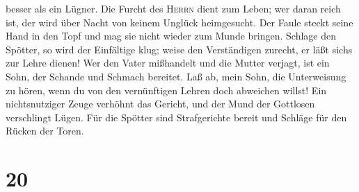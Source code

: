 besser als ein Lügner.  Die Furcht des \textsc{Herrn}
dient zum Leben; wer daran reich ist, der wird über Nacht von keinem
Unglück heimgesucht.  Der Faule steckt seine Hand in den
Topf und mag sie nicht wieder zum Munde bringen.  Schlage
den Spötter, so wird der Einfältige klug; weise den Verständigen
zurecht, er läßt sich\textquotesingle s zur Lehre dienen!
 Wer den Vater mißhandelt und die Mutter verjagt, ist ein
Sohn, der Schande und Schmach bereitet.  Laß ab, mein
Sohn, die Unterweisung zu hören, wenn du von den vernünftigen Lehren
doch abweichen willst!  Ein nichtsnutziger Zeuge verhöhnt
das Gericht, und der Mund der Gottlosen verschlingt Lügen.
 Für die Spötter sind Strafgerichte bereit und Schläge
für den Rücken der Toren.

\hypertarget{section-19}{%
\section{20}\label{section-19}}

